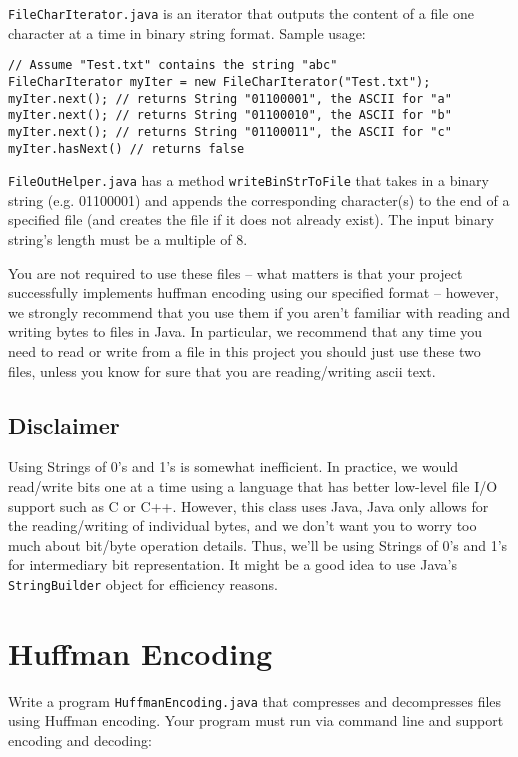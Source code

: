 \documentclass[11pt]{article}
\begin{document}
\texttt{FileCharIterator.java} is an iterator that outputs the content of a file one character at a time in binary string format. Sample usage:
\begin{verbatim}
// Assume "Test.txt" contains the string "abc"
FileCharIterator myIter = new FileCharIterator("Test.txt");
myIter.next(); // returns String "01100001", the ASCII for "a"
myIter.next(); // returns String "01100010", the ASCII for "b"
myIter.next(); // returns String "01100011", the ASCII for "c"
myIter.hasNext() // returns false
\end{verbatim}

\texttt{FileOutHelper.java} has a method \texttt{writeBinStrToFile} that takes in a binary string (e.g. 01100001) and appends the corresponding character(s) to the end of a specified file (and creates the file if it does not already exist). The input binary string's length must be a multiple of 8.

You are not required to use these files -- what matters is that your project successfully implements huffman encoding using our specified format -- however, we strongly recommend that you use them if you aren't familiar with reading and writing bytes to files in Java. In particular, we recommend that any time you need to read or write from a file in this project you should just use these two files, unless you know for sure that you are reading/writing ascii text.

\subsection*{Disclaimer}

Using Strings of 0's and 1's is somewhat inefficient. In practice, we would read/write bits one at a time using a language that has better low-level file I/O support such as C or C++. However, this class uses Java, Java only allows for the reading/writing of individual bytes, and we don't want you to worry too much about bit/byte operation details. Thus, we'll be using Strings of 0's and 1's for intermediary bit representation. It might be a good idea to use Java's \texttt{StringBuilder} object for efficiency reasons.

\newpage

\section{Huffman Encoding}

Write a program \texttt{HuffmanEncoding.java} that compresses and decompresses files using Huffman encoding. Your program must run via command line and support encoding and decoding:
\end{document}
